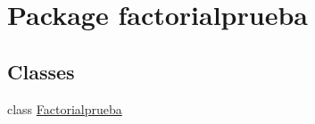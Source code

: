 \hypertarget{namespacefactorialprueba}{}\section{Package factorialprueba}
\label{namespacefactorialprueba}
\subsection*{Classes}
\begin{DoxyCompactItemize}
\item 
class \mbox{\hyperlink{classfactorialprueba_1_1_factorialprueba}{Factorialprueba}}
\end{DoxyCompactItemize}
